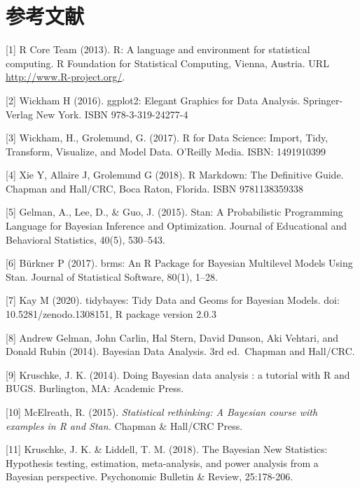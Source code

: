 \documentclass[cn, 11pt, fancy, hide]{elegantbook}
\begin{document}
\hypertarget{References}{%
\chapter*{参考文献}\label{References}}

{[}1{]} R Core Team (2013). R: A language and environment for statistical
computing. R Foundation for Statistical Computing, Vienna, Austria.
URL \url{http://www.R-project.org/}.

{[}2{]} Wickham H (2016). ggplot2: Elegant Graphics for Data Analysis. Springer-Verlag New York. ISBN 978-3-319-24277-4

{[}3{]} Wickham, H., Grolemund, G. (2017). R for Data Science: Import, Tidy, Transform, Visualize, and Model Data. O'Reilly Media. ISBN: 1491910399

{[}4{]} Xie Y, Allaire J, Grolemund G (2018). R Markdown: The Definitive Guide. Chapman and Hall/CRC, Boca Raton, Florida. ISBN 9781138359338

{[}5{]} Gelman, A., Lee, D., \& Guo, J. (2015). Stan: A Probabilistic Programming Language for Bayesian Inference and Optimization. Journal of Educational and Behavioral Statistics, 40(5), 530--543.

{[}6{]} Bürkner P (2017). brms: An R Package for Bayesian Multilevel Models Using Stan. Journal of Statistical Software, 80(1), 1--28.

{[}7{]} Kay M (2020). tidybayes: Tidy Data and Geoms for Bayesian Models. doi: 10.5281/zenodo.1308151, R package version 2.0.3

{[}8{]} Andrew Gelman, John Carlin, Hal Stern, David Dunson, Aki Vehtari, and Donald Rubin (2014). Bayesian Data Analysis. 3rd ed.~Chapman and Hall/CRC.

{[}9{]} Kruschke, J. K. (2014). Doing Bayesian data analysis : a tutorial with R and BUGS. Burlington, MA: Academic Press.

{[}10{]} McElreath, R. (2015). \emph{Statistical rethinking: A Bayesian course with examples in R and Stan.} Chapman \& Hall/CRC Press.

{[}11{]} Kruschke, J. K. \& Liddell, T. M. (2018). The Bayesian New Statistics: Hypothesis testing, estimation, meta-analysis, and power analysis from a Bayesian perspective. Psychonomic Bulletin \& Review, 25:178-206.




\end{document}

